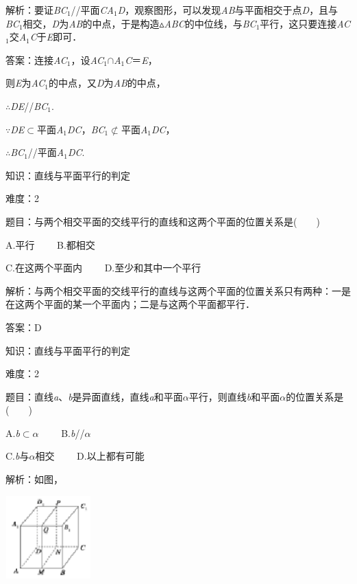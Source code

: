 \documentclass{article} %
\begin{document}
解析：要证\textit{BC}${}_{1}$//平面\textit{CA}${}_{1}$\textit{D}，观察图形，可以发现\textit{AB}与平面相交于点\textit{D}，且与\textit{BC}${}_{1}$相交，\textit{D}为\textit{AB}的中点，于是构造$\mathrm{\vartriangle}$\textit{ABC}的中位线，与\textit{BC}${}_{1}$平行，这只要连接\textit{AC}${}_{1}$交\textit{A}${}_{1}$\textit{C}于\textit{E}即可．

答案：连接\textit{AC}${}_{1}$，设\textit{AC}${}_{1}$$\mathrm{\cap}$\textit{A}${}_{1}$\textit{C}＝\textit{E}，

则\textit{E}为\textit{AC}${}_{1}$的中点，又\textit{D}为\textit{AB}的中点，

$\mathrm{\therefore}$\textit{DE}//\textit{BC}${}_{1}$.

$\mathrm{\because}$\textit{DE}$\mathrm{\subset }$平面\textit{A}${}_{1}$\textit{DC}，\textit{BC}${}_{1}$$\mathrm{\nsubset}$平面\textit{A}${}_{1}$\textit{DC}，

$\mathrm{\therefore}$\textit{BC}${}_{1}$//平面\textit{A}${}_{1}$\textit{DC}.

知识：直线与平面平行的判定

难度：2

题目：与两个相交平面的交线平行的直线和这两个平面的位置关系是(　　)

A.平行　　  B.都相交

C.在这两个平面内　　 D.至少和其中一个平行

解析：与两个相交平面的交线平行的直线与这两个平面的位置关系只有两种：一是在这两个平面的某一个平面内；二是与这两个平面都平行．

答案：D

知识：直线与平面平行的判定

难度：2

题目：直线\textit{a}、\textit{b}是异面直线，直线\textit{a}和平面\textit{$\alpha$}平行，则直线\textit{b}和平面\textit{$\alpha$}的位置关系是(　　)

A.\textit{b}$\mathrm{\subset }$\textit{$\alpha$}　　  B.\textit{b}//\textit{$\alpha$ }

C.\textit{b}与\textit{$\alpha$}相交　　  D.以上都有可能

解析：如图，

\includegraphics*[width=1.30in, height=1.25in, keepaspectratio=false]{image136}
\end{document}
